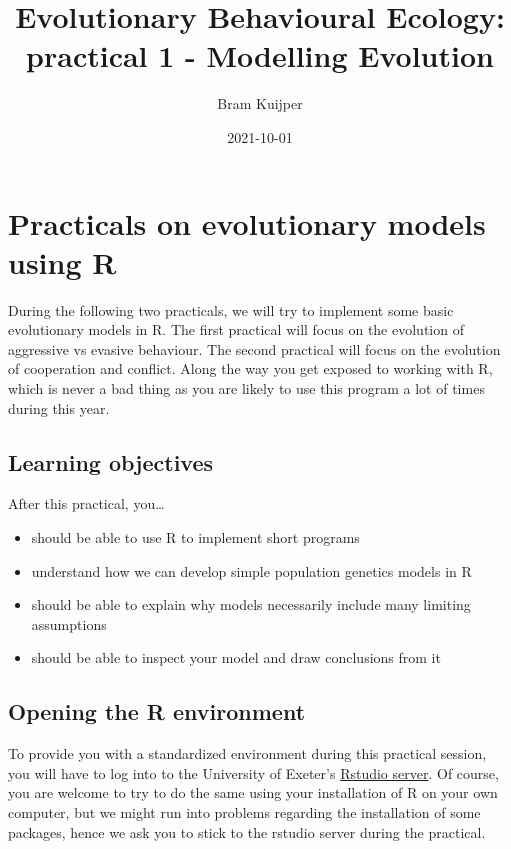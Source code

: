 \documentclass[
]{book}
\title{Evolutionary Behavioural Ecology: practical 1 - Modelling Evolution}
\author{Bram Kuijper}
\date{2021-10-01}
\providecommand{\tightlist}{%
  \setlength{\itemsep}{0pt}\setlength{\parskip}{0pt}}
\begin{document}
\maketitle

{
\setcounter{tocdepth}{1}
\tableofcontents
}
\hypertarget{practicals-on-evolutionary-models-using-r}{%
\chapter{Practicals on evolutionary models using R}\label{practicals-on-evolutionary-models-using-r}}

During the following two practicals, we will try to implement some basic evolutionary models in R. The first practical will focus on the evolution of aggressive vs evasive behaviour. The second practical will focus on the evolution of cooperation and conflict. Along the way you get exposed to working with R, which is never a bad thing as you are likely to use this program a lot of times during this year.

\hypertarget{learning-objectives}{%
\section{Learning objectives}\label{learning-objectives}}

After this practical, you\ldots{}

\begin{itemize}
\tightlist
\item
  should be able to use R to implement short programs
\item
  understand how we can develop simple population genetics models in R
\item
  should be able to explain why models necessarily include many limiting assumptions
\item
  should be able to inspect your model and draw conclusions from it
\end{itemize}

\hypertarget{opening-the-r-environment}{%
\section{Opening the R environment}\label{opening-the-r-environment}}

To provide you with a standardized environment during this practical session, you will have to log into to the University of Exeter's \href{https://rstudio01.cles.ex.ac.uk}{Rstudio server}. Of course, you are welcome to try to do the same using your installation of R on your own computer, but we might run into problems regarding the installation of some packages, hence we ask you to stick to the rstudio server during the practical.
\end{document}
